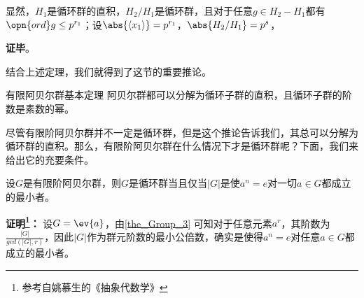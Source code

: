显然，$H_1$是循环群的直积，$H_2/H_1$是循环群，且对于任意$g\in H_2-H_1$都有$\opn{ord}g\leq p^{r_1}$；设$\abs{\langle x_1 \rangle}=p^{r_1}$，$\abs{H_2/H_1}=p^s$，



\textbf{证毕}。















结合上述定理，我们就得到了这节的重要推论。

\begin{corollary}{有限阿贝尔群基本定理}
阿贝尔群都可以分解为循环子群的直积，且循环子群的阶数是素数的幂。
\end{corollary}
尽管有限阶阿贝尔群并不一定是循环群，但是这个推论告诉我们，其总可以分解为循环群的直积。那么，有限阶阿贝尔群在什么情况下才是循环群呢？下面，我们来给出它的充要条件。
\begin{theorem}{}\label{the_cyclic_5}
设$G$是有限阶阿贝尔群，则$G$是循环群当且仅当$|G|$是使$a^n=e$对一切$a\in G$都成立的最小者。
\end{theorem}

\textbf{证明\footnote{参考自姚慕生的《抽象代数学》}：}
设$G=\ev{a}$，由\autoref{the_Group_3} 可知对于任意元素$a^r$，其阶数为$\frac{|G|}{gcd(|G|,r)}$，因此$|G|$作为群元阶数的最小公倍数，确实是使得$a^n=e$对任意$a\in G$都成立的最小者。

